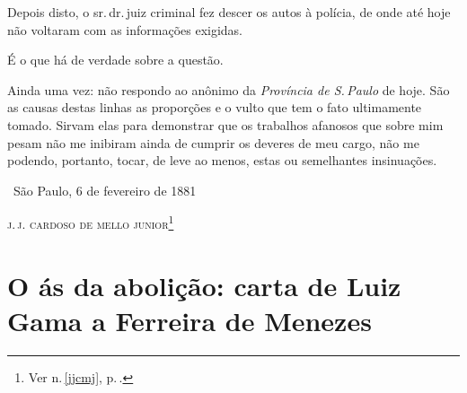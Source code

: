 {Depois disto, o sr.\,dr.\,juiz criminal fez descer os autos à polícia, de
onde até hoje não voltaram com as informações exigidas.

É o que há de verdade sobre a questão.

Ainda uma vez: não respondo ao anônimo da \emph{Província de S.\,Paulo}
de hoje. São as causas destas linhas as proporções e o vulto
que tem o fato ultimamente tomado. Sirvam elas para demonstrar que os
trabalhos afanosos que sobre mim pesam não me inibiram ainda de cumprir
os deveres de meu cargo, não me podendo, portanto, tocar, de leve ao
menos, estas ou semelhantes insinuações.

\medskip
\hfill\ São Paulo, 6 de fevereiro de 1881

\hfill\textsc{j.\,j. cardoso de mello junior}\footnote{Ver n.\,\ref{jjcmj}, p.\,\pageref{jjcmj}.}

\part[O ás da abolição]{O ás da abolição: carta de Luiz Gama a Ferreira de Menezes}


}
